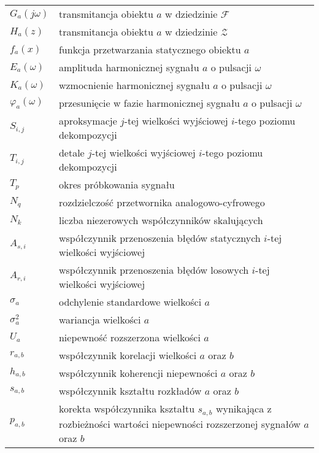 \begin{longtable}[l]{ l @{~~--~~} p{376pt} }
$G_{a}(j\omega)$                & transmitancja obiektu $a$ w dziedzinie $\mathcal{F}$ \\
$H_{a}(z)$                      & transmitancja obiektu $a$ w dziedzinie $\mathcal{Z}$ \\
$f_{a}(x)$                      & funkcja przetwarzania statycznego obiektu $a$ \\
$E_{a}(\omega)$                 & amplituda harmonicznej sygnału $a$ o pulsacji $\omega$ \\
$K_{a}(\omega)$                 & wzmocnienie harmonicznej sygnału $a$ o pulsacji $\omega$ \\
$\varphi_{a}(\omega)$           & przesunięcie w fazie harmonicznej sygnału $a$ o pulsacji $\omega$ \\
$S_{i,j}$                       & aproksymacje $j$-tej wielkości wyjściowej $i$-tego poziomu dekompozycji \\
$T_{i,j}$                       & detale $j$-tej wielkości wyjściowej $i$-tego poziomu dekompozycji \\
$T_{p}$                         & okres próbkowania sygnału \\
$N_{q}$                         & rozdzielczość przetwornika analogowo-cyfrowego \\
$N_{k}$                         & liczba niezerowych współczynników skalujących \\
$A_{s,i}$                       & współczynnik przenoszenia błędów statycznych $i$-tej wielkości wyjściowej \\
$A_{r,i}$                       & współczynnik przenoszenia błędów losowych $i$-tej wielkości wyjściowej \\
$\sigma_{a}$                    & odchylenie standardowe wielkości $a$ \\
$\sigma_{a}^{2}$                & wariancja wielkości $a$ \\
$U_{a}$                         & niepewność rozszerzona wielkości $a$ \\
$r_{a,b}$                       & współczynnik korelacji wielkości $a$ oraz $b$ \\
$h_{a,b}$                       & współczynnik koherencji niepewności $a$ oraz $b$ \\
$s_{a,b}$                       & współczynnik kształtu rozkładów $a$ oraz $b$ \\
$p_{a,b}$                       & korekta współczynnika kształtu $s_{a,b}$ wynikająca z rozbieżności wartości niepewności rozszerzonej sygnałów $a$ oraz $b$ \\

\end{longtable}
